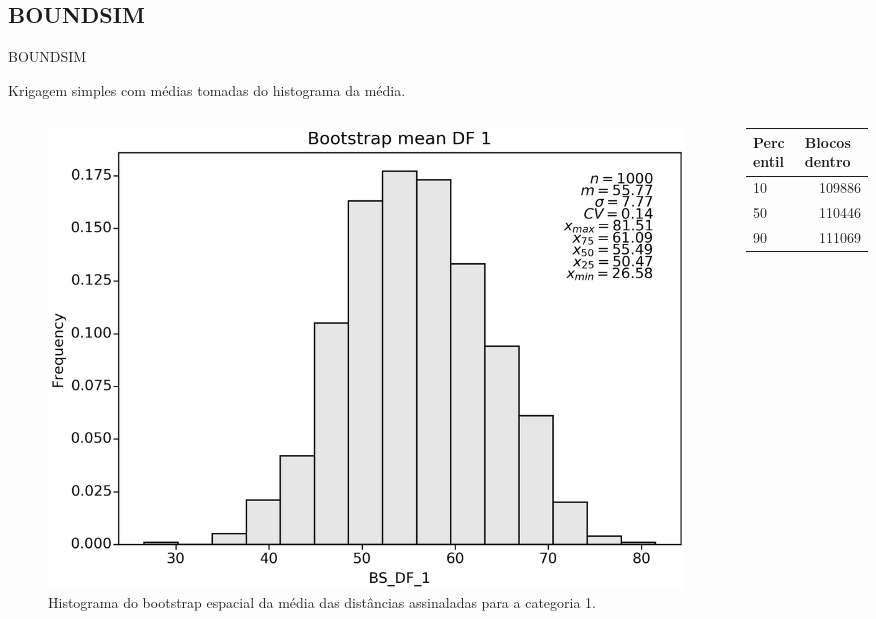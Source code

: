 \documentclass[aspectratio=169]{beamer}
\begin{document}
\subsection{BOUNDSIM}

\begin{frame}{BOUNDSIM}

Krigagem simples com médias tomadas do histograma da média.

\begin{columns}
	\begin{column}{0.5\textwidth}
	\begin{figure}[H]
		\caption{\label{bs_df_1}Histograma do bootstrap espacial da média das distâncias assinaladas para a categoria 1.}
		\begin{center}
			\includegraphics[width=\textwidth]{capitulo_2/BS_DF_1.png}
		\end{center}
	\end{figure}
	\end{column}
	\begin{column}{0.5\textwidth}  %
	\begin{table}[H]
			\begin{center}
					\begin{tabular}{lr}
					Percentil & \multicolumn{1}{l}{Blocos dentro} \\ \hline
					10 & 109886 \\
					50 & 110446 \\
					90 & 111069 \\ \hline
				\end{tabular}


\end{center}
\end{table}
\end{column}
\end{columns}
\end{frame}
\end{document}
